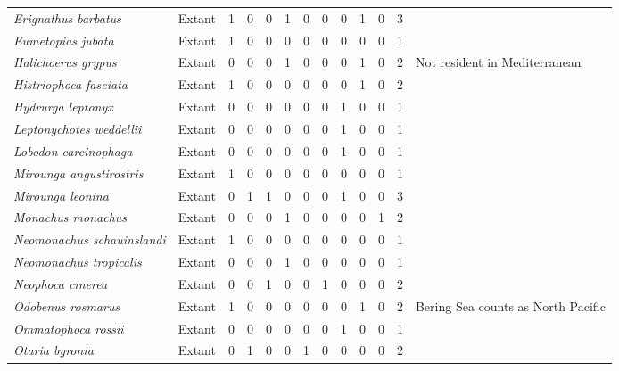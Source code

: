 \begin{longtable}{llccccccccccp{}}
\textit{Erignathus barbatus} &
Extant &
1 &
0 &
0 &
1 &
0 &
0 &
0 &
1 &
0 &
3 &
\\

\textit{Eumetopias jubata} &
Extant &
1 &
0 &
0 &
0 &
0 &
0 &
0 &
0 &
0 &
1 &
\\

\textit{Halichoerus grypus} &
Extant &
0 &
0 &
0 &
1 &
0 &
0 &
0 &
1 &
0 &
2 &
Not resident in Mediterranean\\

\textit{Histriophoca fasciata} &
Extant &
1 &
0 &
0 &
0 &
0 &
0 &
0 &
1 &
0 &
2 &
\\

\textit{Hydrurga leptonyx} &
Extant &
0 &
0 &
0 &
0 &
0 &
0 &
1 &
0 &
0 &
1 &
\\

\textit{Leptonychotes weddellii} &
Extant &
0 &
0 &
0 &
0 &
0 &
0 &
1 &
0 &
0 &
1 &
\\

\textit{Lobodon carcinophaga} &
Extant &
0 &
0 &
0 &
0 &
0 & 
0 &
1 &
0 &
0 &
1 &
\\

\textit{Mirounga angustirostris} &
Extant &
1 &
0 &
0 &
0 &
0 &
0 &
0 &
0 &
0 &
1 &
\\

\textit{Mirounga leonina} &
Extant &
0 &
1 &
1 &
0 &
0 &
0 &
1 &
0 &
0 &
3 &
\\

\textit{Monachus monachus} &
Extant &
0 &
0 &
0 &
1 &
0 &
0 &
0 &
0 &
1 &
2 &
\\

\textit{Neomonachus schauinslandi} &
Extant &
1 &
0 &
0 &
0 &
0 &
0 &
0 &
0 &
0 &
1 &
\\


\textit{Neomonachus tropicalis} &
Extant &
0 &
0 &
0 &
1 &
0 &
0 &
0 &
0 &
0 &
1 &
\\

\textit{Neophoca cinerea} &
Extant &
0 &
0 &
1 &
0 &
0 &
1 &
0 &
0 &
0 &
2 &
\\

\textit{Odobenus rosmarus} &
Extant &
1 &
0 &
0 &
0 &
0 &
0 &
0 &
1 &
0 &
2 &
Bering Sea counts as North Pacific\\

\textit{Ommatophoca rossii} &
Extant &
0 &
0 &
0 &
0 &
0 &
0 &
1 &
0 &
0 &
1 &
\\

\textit{Otaria byronia} &
Extant &
0 &
1 &
0 &
0 &
1 &
0 &
0 &
0 &
0 &
2 &
\\


\end{longtable}
